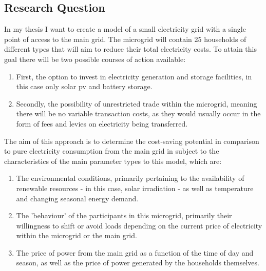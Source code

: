 \documentclass[
	11pt,								%
	DIV10,								%
	a4paper,         					%
	oneside,							%
	headheight=20pt,					%
	footheight=20pt,					%
    parskip=full,						%
    listof=totoc,						%
	bibliography=totoc,					%
	index=totoc,						%
]{scrartcl}
\begin{document}
\subsection{Research Question}
In my thesis I want to create a model of a small electricity grid with a single point of access to the main grid. The microgrid will contain 25 households of different types that will aim to reduce their total electricity costs. To attain this goal there will be two possible courses of action available: 
	\begin{enumerate}
	\item First, the option to invest in electricity generation and storage facilities, in this case only solar pv and battery storage. 
	\item Secondly, the possibility of unrestricted trade within the microgrid, meaning there will be no variable transaction costs, as they would usually occur in the form of fees and levies on electricity being transferred.		
	\end{enumerate}
	The aim of this approach is to determine the cost-saving potential in comparison to pure electricity consumption from the main grid in subject to the characteristics of the main parameter types to this model, which are:
	\begin{enumerate}
	\item The environmental conditions, primarily pertaining to the availability of renewable resources - in this case, solar irradiation - as well as temperature and changing seasonal energy demand.
	\item The 'behaviour' of the participants in this microgrid, primarily their willingness to shift or avoid loads depending on the current price of electricity within the microgrid or the main grid.
	\item The price of power from the main grid as a function of the time of day and  season, as well as the price of power generated by the households themselves.
	\end{enumerate}
\end{document}
